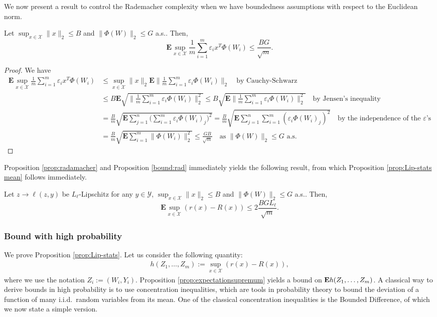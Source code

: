 We now present a result to control the Rademacher complexity when we have boundedness assumptions with respect to the Euclidean norm.

\begin{proposition}
\label{bound:rad}
Let $\sup_{x\in\mathcal{X}}\|x\|_2 \le B$ and $\|\Phi(W)\|_2\le G$ a.s.. Then,
$$
	\mathbf{E} \sup_{x\in\mathcal{X}} \frac{1}{m}\sum_{i=1}^m\varepsilon_i x^T\Phi(W_i)
	\le 
	\frac{BG}{\sqrt{m}}.
$$
\end{proposition}

\begin{proof}
We have
\begin{align*}
	\mathbf{E} \sup_{x\in\mathcal{X}} \frac{1}{m}\sum_{i=1}^m\varepsilon_i x^T\Phi(W_i)
	&\le \sup_{x\in\mathcal{X}} \| x \|_2
	\mathbf{E} \bigg\|\frac{1}{m}\sum_{i=1}^m\varepsilon_i \Phi(W_i)\bigg\|_2 \quad \text{by Cauchy-Schwarz}\\
	&\le B\mathbf{E} \sqrt{\bigg\|\frac{1}{m}\sum_{i=1}^m\varepsilon_i \Phi(W_i)\bigg\|_2^2}
	\le B \sqrt{ \mathbf{E} \bigg\|\frac{1}{m}\sum_{i=1}^m\varepsilon_i \Phi(W_i)\bigg\|_2^2} \quad \text{by Jensen's inequality}\\
	&= \frac{B}{m} \sqrt{ \mathbf{E} \sum_{j=1}^n \bigg(\sum_{i=1}^m \varepsilon_i \Phi(W_i)_j\bigg)^2 } 
	= \frac{B}{m} \sqrt{ \mathbf{E} \sum_{j=1}^n \sum_{i=1}^m (\varepsilon_i \Phi(W_i)_j)^2 } \quad \text{by the independence of the $\varepsilon$'s}\\
	&= \frac{B}{m} \sqrt{ \mathbf{E}  \sum_{i=1}^m \| \Phi(W_i)\|^2_2 }
	\le \frac{G B}{\sqrt{m}} \quad \text{as $\|\Phi(W)\|_2\le G$ a.s.}
\end{align*}
\end{proof}

Proposition \ref{prop:radamacher} and Proposition \ref{bound:rad} immediately yields the following result, from which Proposition \ref{prop:Lip-stats mean} follows immediately.
\begin{proposition}
\label{prop:expectationsupremum}
Let $z\rightarrow \ell(z,y)$ be $L_\ell$-Lipschitz for any $y\in\mathcal{Y}$, $\sup_{x\in\mathcal{X}}\|x\|_2 \le B$ and $\|\Phi(W)\|_2\le G$ a.s.. Then,
$$
	\mathbf{E}\sup_{x\in\mathcal{X}} ( r(x) - R(x) )
	\le
	2\frac{BGL_\ell}{\sqrt{m}}.
$$
\end{proposition}

\subsubsection{Bound with high probability}
\label{sec:high probability}
We prove Proposition \ref{prop:Lip-stats}. Let us consider the following quantity:
\begin{align}
	h(Z_1,\ldots,Z_m) := \sup_{x\in\mathcal{X}} ( r(x) - R(x) ),
	\label{def:h}
\end{align}
where we use the notation $Z_i := (W_i,Y_i)$. Proposition \ref{prop:expectationsupremum} yields a bound on $\mathbf{E} h(Z_1,\ldots,Z_m)$. A classical way to derive bounds in high probability is to use concentration inequalities, which are tools in probability theory to bound the deviation of a function of many i.i.d.\ random variables from its mean. One of the classical concentration inequalities is the Bounded Difference, of which we now state a simple version.

